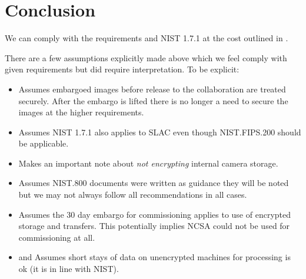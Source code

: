 \section{Conclusion}\label{sec:conc}
We can comply with the requirements and NIST 1.7.1 at the cost outlined in .

There are a few assumptions explicitly made above which we feel comply with given requirements but did require interpretation. To be explicit:
\begin{itemize}
\item {} Assumes embargoed images before release to the collaboration are treated securely. After the embargo is lifted there is no longer a need to secure the images at the higher requirements.
\item {} Assumes NIST 1.7.1 also applies to SLAC even though NIST.FIPS.200 should be applicable.
\item {} Makes an important note about \emph{not encrypting} internal camera storage.
\item {} Assumes NIST.800 documents were written as guidance  they will be noted but we may not always follow all recommendations in all cases.
\item {} Assumes the 30 day embargo for commissioning applies to use of encrypted storage and transfers. This potentially implies NCSA could not be used for commissioning at all.
\item {} and  Assumes short stays of data on unencrypted machines for processing is ok (it is in line with NIST).

\end{itemize}
